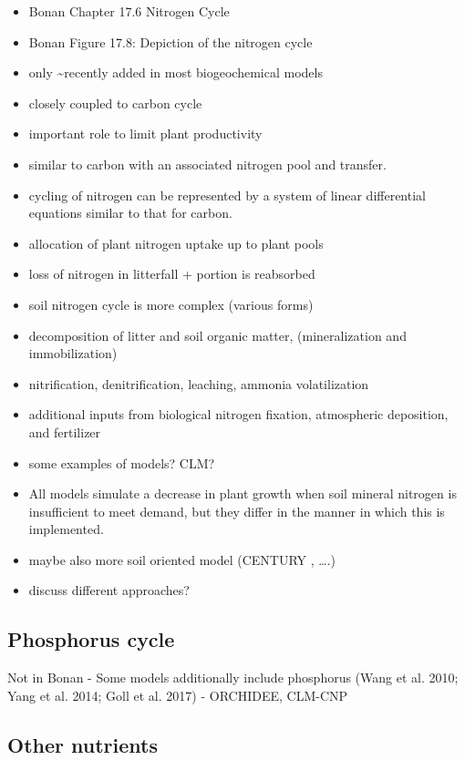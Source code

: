 \documentclass[oneside]{book}
\begin{document}
\begin{itemize}
\item
  Bonan Chapter 17.6 Nitrogen Cycle
\item
  Bonan Figure 17.8: Depiction of the nitrogen cycle
\item
  only \textasciitilde{}recently added in most biogeochemical models
\item
  closely coupled to carbon cycle
\item
  important role to limit plant productivity
\item
  similar to carbon with an associated nitrogen pool and transfer.
\item
  cycling of nitrogen can be represented by a system of linear
  differential equations similar to that for carbon.
\item
  allocation of plant nitrogen uptake up to plant pools
\item
  loss of nitrogen in litterfall + portion is reabsorbed
\item
  soil nitrogen cycle is more complex (various forms)
\item
  decomposition of litter and soil organic matter, (mineralization and
  immobilization)
\item
  nitrification, denitrification, leaching, ammonia volatilization
\item
  additional inputs from biological nitrogen fixation, atmospheric
  deposition, and fertilizer
\item
  some examples of models? CLM?
\item
  All models simulate a decrease in plant growth when soil mineral
  nitrogen is insufficient to meet demand, but they differ in the manner
  in which this is implemented.
\item
  maybe also more soil oriented model (CENTURY , \ldots{}.)
\item
  discuss different approaches?
\end{itemize}

\subsection{Phosphorus cycle}\label{phosphorus-cycle}

Not in Bonan - Some models additionally include phosphorus (Wang et al.
2010; Yang et al. 2014; Goll et al. 2017) - ORCHIDEE, CLM-CNP

\subsection{Other nutrients}\label{other-nutrients}
\end{document}
